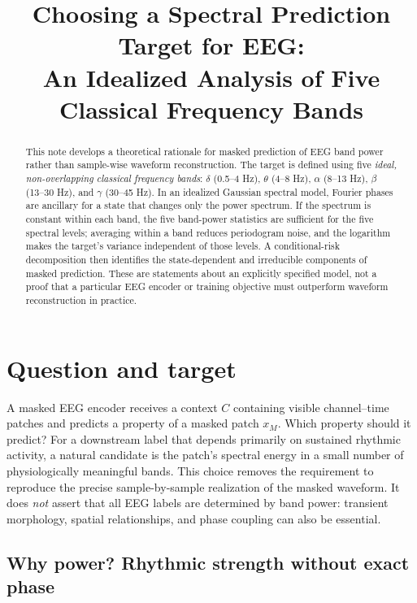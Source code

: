 \documentclass[11pt,a4paper]{article}
\title{Choosing a Spectral Prediction Target for EEG:\\
An Idealized Analysis of Five Classical Frequency Bands}
\author{}
\date{}
\begin{document}
\maketitle

\begin{abstract}
This note develops a theoretical rationale for masked prediction of EEG band power rather
than sample-wise waveform reconstruction. The target is defined using five \emph{ideal,
non-overlapping classical frequency bands}: $\delta$ (0.5--4 Hz), $\theta$ (4--8 Hz),
$\alpha$ (8--13 Hz), $\beta$ (13--30 Hz), and $\gamma$ (30--45 Hz). In an idealized
Gaussian spectral model, Fourier phases are ancillary for a state that changes only the
power spectrum. If the spectrum is constant within each band, the five band-power
statistics are sufficient for the five spectral levels; averaging within a band reduces
periodogram noise, and the logarithm makes the target's variance independent of those
levels. A conditional-risk decomposition then identifies the state-dependent and
irreducible components of masked prediction. These are statements about an explicitly
specified model, not a proof that a particular EEG encoder or training objective must
outperform waveform reconstruction in practice.
\end{abstract}

\section{Question and target}

A masked EEG encoder receives a context $C$ containing visible channel--time patches and
predicts a property of a masked patch $x_M$. Which property should it predict? For a
downstream label that depends primarily on sustained rhythmic activity, a natural
candidate is the patch's spectral energy in a small number of physiologically meaningful
bands. This choice removes the requirement to reproduce the precise sample-by-sample
realization of the masked waveform. It does \emph{not} assert that all EEG labels are
determined by band power: transient morphology, spatial relationships, and phase coupling
can also be essential.

\subsection{Why power? Rhythmic strength without exact phase}
\end{document}
